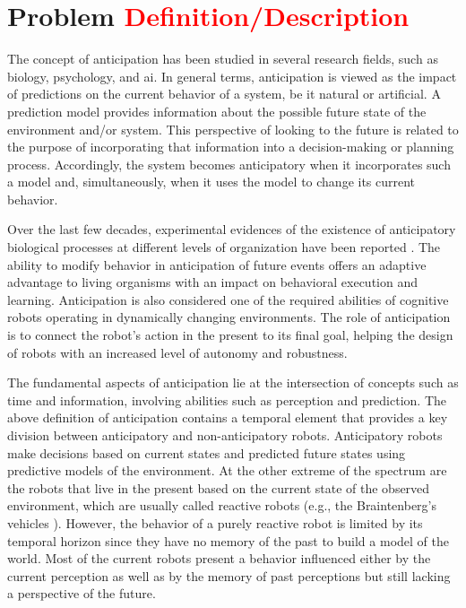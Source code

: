 \section{Problem \textcolor{red}{Definition/Description}}

The concept of anticipation has been studied in several research fields, such as biology, psychology, and \acl{ai}. In general terms, anticipation is viewed as the impact of predictions on the current behavior of a system, be it natural or artificial. A prediction model provides information about the possible future state of the environment and/or system. This perspective of looking to the future is related to the purpose of incorporating that information into a decision-making or planning process. Accordingly, the system becomes anticipatory when it incorporates such a model and, simultaneously, when it uses the model to change its current behavior.

Over the last few decades, experimental evidences of the existence of anticipatory biological processes at different levels of organization have been reported \cite{Deans2021,Poli2010}. The ability to modify behavior in anticipation of future events offers an adaptive advantage to living organisms with an impact on behavioral execution and learning. Anticipation is also considered one of the required abilities of cognitive robots operating in dynamically changing environments. The role of anticipation is to connect the robot’s action in the present to its final goal, helping the design of robots with an increased level of autonomy and robustness.

The fundamental aspects of anticipation lie at the intersection of concepts such as time and information, involving abilities such as perception and prediction. The above definition of anticipation contains a temporal element that provides a key division between anticipatory and non-anticipatory robots. Anticipatory robots make decisions based on current states and predicted future states using predictive models of the environment. At the other extreme of the spectrum are the robots that live in the present based on the current state of the observed environment, which are usually called reactive robots (e.g., the Braintenberg’s vehicles \cite{Braitenberg1986}). However, the behavior of a purely reactive robot is limited by its temporal horizon since they have no memory of the past to build a model of the world. Most of the current robots present a behavior influenced either by the current perception as well as by the memory of past perceptions but still lacking a perspective of the future.

